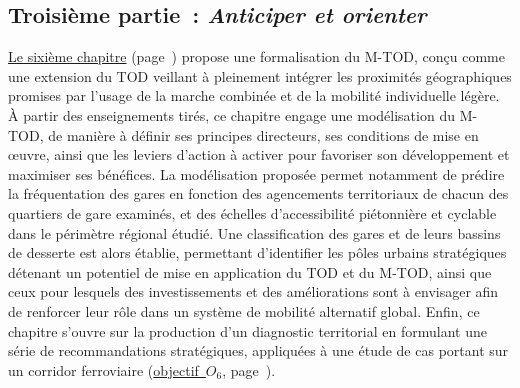 \begin{refsegment}
\subsection*{Troisième partie~: \textsl{Anticiper et orienter}
    \label{introduction-generale:annonce-plan-3}
    }

\hyperref[chap6:titre]{Le sixième chapitre} (page~\pageref{chap6:titre}) propose une formalisation du \acrshort{M-TOD}, conçu comme une extension du \acrshort{TOD} veillant à pleinement intégrer les proximités géographiques promises par l'usage de la marche combinée et de la mobilité individuelle légère. À partir des enseignements tirés, ce chapitre engage une modélisation du \acrshort{M-TOD}, de manière à définir ses principes directeurs, ses conditions de mise en œuvre, ainsi que les leviers d’action à activer pour favoriser son développement et maximiser ses bénéfices. La modélisation proposée permet notamment de prédire la fréquentation des gares en fonction des agencements territoriaux de chacun des quartiers de gare examinés, et des échelles d’accessibilité piétonnière et cyclable dans le périmètre régional étudié. Une classification des gares et de leurs bassins de desserte est alors établie, permettant d’identifier les pôles urbains stratégiques détenant un potentiel de mise en application du \acrshort{TOD} et du \acrshort{M-TOD}, ainsi que ceux pour lesquels des investissements et des améliorations sont à envisager afin de renforcer leur rôle dans un système de mobilité alternatif global. Enfin, ce chapitre s’ouvre sur la production d'un diagnostic territorial en formulant une série de recommandations stratégiques, appliquées à une étude de cas portant sur un corridor ferroviaire (\hyperref[objectif-6]{objectif~\(O_6\)}, page~\pageref{objectif-6}).%

    \newpage
    \begingroup
    \renewcommand{\bibfont}{\scriptsize}
\printbibliography[segment=\therefsegment, heading=subbibintoc, title={Sous-bibliographie de l'introduction générale}, label=introduction:bibliographie]
    \endgroup
    \end{refsegment}